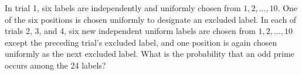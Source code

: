 In trial 1, six labels are independently and uniformly chosen from $1,2,\ldots,10$. One of the six positions is chosen uniformly to designate an excluded label. In each of trials 2, 3, and 4, six new independent uniform labels are chosen from $1,2,\ldots,10$ except the preceding trial's excluded label, and one position is again chosen uniformly as the next excluded label. What is the probability that an odd prime occurs among the 24 labels?
